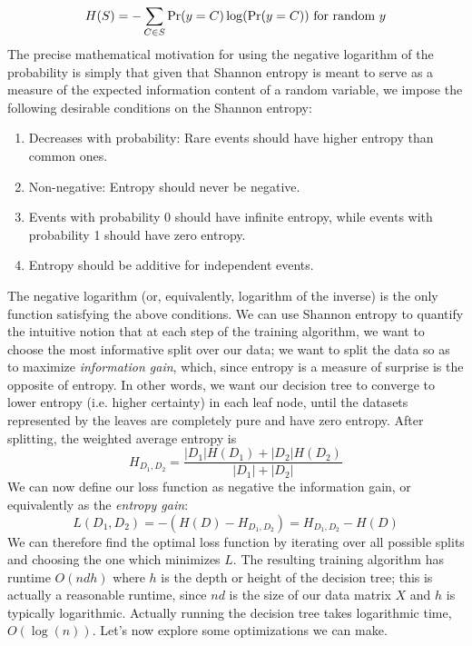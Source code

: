 \documentclass{article}
\begin{document}
$$ H(S) = - \sum_{C \in S} \text{Pr}(y = C) \log(\text{Pr}(y = C)) \text{ for random $ y $} $$
\indent The precise mathematical motivation for using the negative logarithm of the probability is simply that given that Shannon entropy is meant to serve as a measure of the expected information content of a random variable, we impose the following desirable conditions on the Shannon entropy:
\begin{enumerate}
    \item Decreases with probability: Rare events should have higher entropy than common ones.
    \item Non-negative: Entropy should never be negative.
    \item Events with probability 0 should have infinite entropy, while events with probability 1 should have zero entropy.
    \item Entropy should be additive for independent events.
\end{enumerate}
\indent The negative logarithm (or, equivalently, logarithm of the inverse) is the only function satisfying the above conditions.
\newline \newline
We can use Shannon entropy to quantify the intuitive notion that at each step of the training algorithm, we want to choose the most informative split over our data; we want to split the data so as to maximize \textit{information gain}, which, since entropy is a measure of surprise is the opposite of entropy. In other words, we want our decision tree to converge to lower entropy (i.e. higher certainty) in each leaf node, until the datasets represented by the leaves are completely pure and have zero entropy. After splitting, the weighted average entropy is
$$ H_{D_1, D_2} = \frac{|D_1| H(D_1) + |D_2| H(D_2)}{|D_1| + |D_2|} $$
We can now define our loss function as negative the information gain, or equivalently as the \textit{entropy gain}:
$$ L(D_1, D_2) = - (H(D) - H_{D_1, D_2}) = H_{D_1, D_2} - H(D) $$
We can therefore find the optimal loss function by iterating over all possible splits and choosing the one which minimizes $ L $. The resulting training algorithm has runtime $ O(n d h) $ where $ h $ is the depth or height of the decision tree; this is actually a reasonable runtime, since $ n d $ is the size of our data matrix $ X $ and $ h $ is typically logarithmic. Actually running the decision tree takes logarithmic time, $ O(\log(n)) $. Let's now explore some optimizations we can make.
\newline \newline
\end{document}
